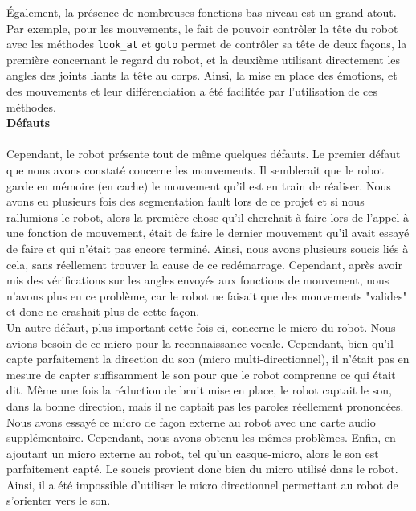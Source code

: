 \documentclass[a4paper,french]{article}
\begin{document}
\'Egalement, la présence de nombreuses fonctions bas niveau est un grand atout. Par exemple, pour les mouvements, le fait de pouvoir contrôler la tête du robot avec les méthodes \texttt{look\_at} et \texttt{goto} permet de contrôler sa tête de deux façons, la première concernant le regard du robot, et la deuxième utilisant directement les angles des joints liants la tête au corps. Ainsi, la mise en place des émotions, et des mouvements et leur différenciation a été facilitée par l'utilisation de ces méthodes. \\

\textbf{Défauts}\\\\
Cependant, le robot présente tout de même quelques défauts. Le premier défaut que nous avons constaté concerne les mouvements. Il semblerait que le robot garde en mémoire (en cache) le mouvement qu'il est en train de réaliser. Nous avons eu plusieurs fois des segmentation fault lors de ce projet et si nous rallumions le robot, alors la première chose qu'il cherchait à faire lors de l'appel à une fonction de mouvement, était de faire le dernier mouvement qu'il avait essayé de faire et qui n'était pas encore terminé. Ainsi, nous avons plusieurs soucis liés à cela, sans réellement trouver la cause de ce redémarrage. Cependant, après avoir mis des vérifications sur les angles envoyés aux fonctions de mouvement, nous n'avons plus eu ce problème, car le robot ne faisait que des mouvements "valides" et donc ne crashait plus de cette façon. \\

Un autre défaut, plus important cette fois-ci, concerne le micro du robot. Nous avions besoin de ce micro pour la reconnaissance vocale. Cependant, bien qu'il capte parfaitement la direction du son (micro multi-directionnel), il n'était pas en mesure de capter suffisamment le son pour que le robot comprenne ce qui était dit. Même une fois la réduction de bruit mise en place, le robot captait le son, dans la bonne direction, mais il ne captait pas les paroles réellement prononcées. \\
Nous avons essayé ce micro de façon externe au robot avec une carte audio supplémentaire. Cependant, nous avons obtenu les mêmes problèmes. Enfin, en ajoutant un micro externe au robot, tel qu'un casque-micro, alors le son est parfaitement capté. Le soucis provient donc bien du micro utilisé dans le robot. \\ Ainsi, il a été impossible d'utiliser le micro directionnel permettant au robot de s'orienter vers le son. \\
\end{document}

